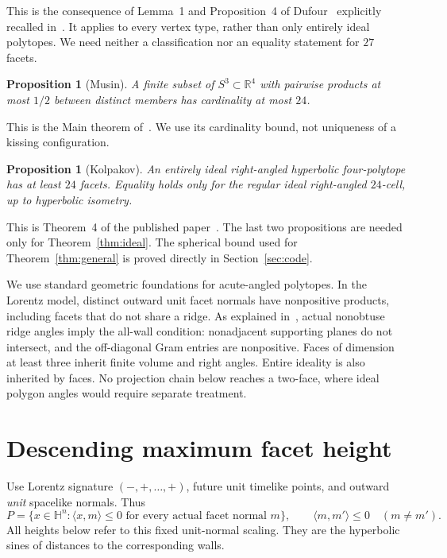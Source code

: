 \documentclass[11pt]{article}
\newtheorem{proposition}[theorem]{Proposition}
\theoremstyle{remark}
\newcommand{\HH}{\mathbb H}
\newcommand{\RR}{\mathbb R}
\newcommand{\ip}[2]{\langle #1,#2\rangle}
\begin{document}
This is the consequence of Lemma~1 and Proposition~4 of
Dufour~\cite{Dufour} explicitly recalled in~\cite[Section~4]{Alex}.
It applies to every vertex type, rather than only entirely ideal
polytopes. We need neither a classification nor an equality statement
for $27$ facets.

\begin{proposition}[Musin]\label{prop:musin}
A finite subset of $S^3\subset\RR^4$ with pairwise products at most
$1/2$ between distinct members has cardinality at most $24$.
\end{proposition}

This is the Main theorem of~\cite[p.~4]{Musin}. We use its
cardinality bound, not uniqueness of a kissing configuration.

\begin{proposition}[Kolpakov]\label{prop:24}
An entirely ideal right-angled hyperbolic four-polytope has at least
$24$ facets. Equality holds only for the regular ideal right-angled
$24$-cell, up to hyperbolic isometry.
\end{proposition}

This is Theorem~4 of the published paper~\cite[p.~1945]{Kolpakov}.
The last two propositions are needed only for Theorem~\ref{thm:ideal}.
The spherical bound used for Theorem~\ref{thm:general} is proved
directly in Section~\ref{sec:code}.

We use standard geometric foundations for acute-angled polytopes.
In the Lorentz model, distinct outward unit facet normals have
nonpositive products, including facets that do not share a ridge.
As explained in~\cite[p.~42, \S2.1]{Vinberg}, actual nonobtuse ridge
angles imply the all-wall condition: nonadjacent supporting planes
do not intersect, and the off-diagonal Gram entries are nonpositive.
Faces of dimension at least three inherit finite volume and right
angles. Entire ideality is also inherited by faces. No projection
chain below reaches a two-face, where ideal polygon angles would
require separate treatment.

\section{Descending maximum facet height}\label{sec:descent}

Use Lorentz signature $(-,+,\ldots,+)$, future unit timelike points,
and outward \emph{unit} spacelike normals. Thus
\[
 P=\{x\in\HH^n:\ip{x}{m}\le0\text{ for every actual facet normal }m\},
 \qquad \ip{m}{m'}\le0\quad(m\ne m').
\]
All heights below refer to this fixed unit-normal scaling. They are
the hyperbolic sines of distances to the corresponding walls.
\end{document}
